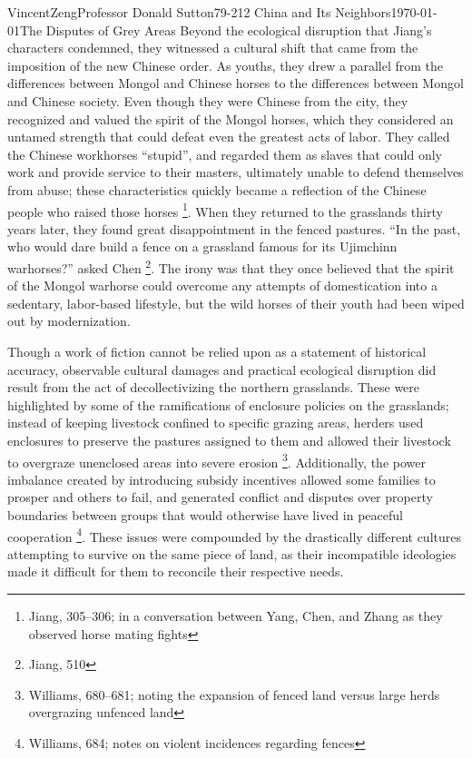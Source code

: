 \documentclass{article}[12pt]
\begin{document}
\begin{mla}{Vincent}{Zeng}{Professor Donald Sutton}{79-212 China and Its Neighbors}{\today}{The Disputes of Grey Areas}
	Beyond the ecological disruption that Jiang's characters condemned,
	they witnessed a cultural shift that came from the imposition of the
	new Chinese order. As youths, they drew a parallel from the differences
	between Mongol and Chinese horses to the differences between Mongol and
	Chinese society. Even though they were Chinese from the city, they
	recognized and valued the spirit of the Mongol horses, which they
	considered an untamed
	strength that could defeat even the greatest acts of labor. They called
	the Chinese workhorses ``stupid'', and regarded them as slaves that could
	only work and provide service to their masters, ultimately unable to defend
	themselves from abuse; these characteristics quickly became a
	reflection of the Chinese people who raised those horses
	\footnote{Jiang, 305--306; in a conversation between Yang, Chen, and
	Zhang as they observed horse mating fights}. When they returned to the grasslands thirty years later, they
	found great disappointment in the fenced pastures. ``In the past,
	who would dare build a fence on a grassland famous for its Ujimchinn
	warhorses?'' asked Chen \footnote{Jiang, 510}. The irony was that they
	once believed that the spirit of the Mongol warhorse could overcome any
	attempts of domestication into a sedentary, labor-based lifestyle, but
	the wild horses of their youth had been wiped out by modernization. 

	Though a work of fiction cannot be relied upon as a statement of
	historical accuracy, observable cultural damages and practical
	ecological disruption did result from the act of
	decollectivizing the northern grasslands. These were highlighted by some of the
	ramifications of enclosure policies on the grasslands; instead of
	keeping livestock confined to specific grazing areas, herders used
	enclosures to preserve the pastures assigned to them and allowed their
	livestock to overgraze unenclosed areas into severe erosion
	\footnote{Williams, 680--681; noting the expansion of fenced land
	versus large herds overgrazing unfenced land}. Additionally, the power imbalance
	created by introducing subsidy incentives allowed some families to
	prosper and
	others to fail, and generated conflict and disputes over property
	boundaries between groups that would otherwise have lived in peaceful
	cooperation \footnote{Williams, 684; notes on violent incidences regarding fences}. These issues were compounded by the drastically different cultures attempting to survive on the same piece of land, as their incompatible ideologies made it difficult for them to reconcile their respective needs.


\end{mla}
\end{document}
